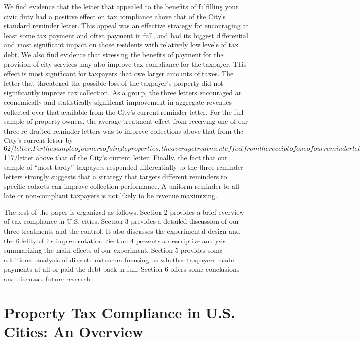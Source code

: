 \documentclass[12pt,titlepage]{article}
\begin{document}
We find evidence that the letter that appealed to the benefits of
fulfilling your civic duty had a positive 
effect on tax compliance above that of the City's standard reminder
letter.  This appeal was an effective strategy for encouraging
at least some tax payment and often payment in full, and had its
biggest differential and most significant impact on those residents
with relatively low levels of tax debt.  We also find evidence
that stressing the benefits of payment for the provision of city
services may also improve tax compliance for the taxpayer. 
This effect is most significant for taxpayers that owe larger
amounts of taxes. The letter that threatened the possible loss of the
taxpayer's property did not significantly improve tax collection.
As a group, the three letters encouraged an economically and
statistically significant improvement in aggregate revenues collected
over that available from the City’s current reminder letter.
For the full sample of property owners, the average treatment effect
from receiving one of our three re-drafted reminder letters was to 
improve collections above that from the City’s current letter by 
$62/letter.   For the sample of owners of single properties, the average 
treatment effect from the receipt of one of our reminder letters was 
$117/letter above that of the City’s current letter.  Finally, the fact 
that our sample of “most tardy” taxpayers responded differentially to 
the three reminder letters strongly suggests that a strategy that 
targets different reminders to specific cohorts can improve collection 
performance.  A uniform reminder to all late or non-compliant 
taxpayers is not likely to be revenue maximizing.

The rest of the paper is organized as follows.  Section 2 provides a
brief overview of tax compliance in U.S. cities. Section 3 provides
a detailed discussion of our three treatments and the control. It also
discusses the experimental design and the fidelity of its
implementation. Section 4 presents a descriptive analysis summarizing
the main effects of our experiment.  Section 5 provides some additional
analysis of discrete outcomes focusing on whether taxpayers made 
payments at all or paid the debt back in full.
Section 6 offers some conclusions and discusses future research.


\section{Property Tax Compliance in U.S. Cities: An Overview}
\end{document}
